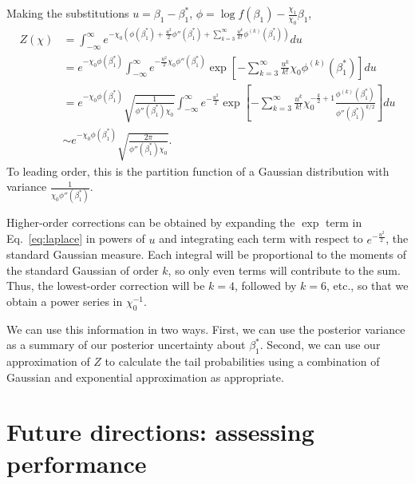 \documentclass[12pt, letterpaper]{article}
\begin{document}
Making the substitutions $u = \beta_1 - \beta_1^*$, $\phi = \log f(\beta_1) - \frac{\chi_1}{\chi_0} \beta_1$,
\begin{align}
    Z(\chi) & = \int_{-\infty}^{\infty}
        e^{- \chi_0 \left(\phi(\beta_1^*) + \frac{u^2}{2}\phi''(\beta_1^*) + \sum_{k=3}^{\infty}\frac{u^k}{k!}\phi^{(k)}(\beta_1^*) \right)} du \\
            & = e^{- \chi_0 \phi(\beta_1^*)}
            \int_{-\infty}^{\infty} e^{- \frac{u^2}{2} \chi_0 \phi''(\beta_1^*)} \exp \left[ - \sum_{k=3}^{\infty}\frac{u^k}{k!} \chi_0 \phi^{(k)}(\beta_1^*)\right] du \\
            & = e^{- \chi_0 \phi(\beta_1^*)} \sqrt{\frac{1}{\phi''(\beta_1^*)\chi_0}}
            \int_{-\infty}^{\infty} e^{- \frac{u^2}{2}} \exp \left[ - \sum_{k=3}^{\infty}\frac{u^k}{k!} \chi_0^{-\frac{k}{2}+1} \frac{\phi^{(k)}(\beta_1^*)}{{\phi''(\beta_1^*)}^{k/2}} \right] du \label{eq:laplace}\\
            & \sim e^{- \chi_0 \phi(\beta_1^*)} \sqrt{\frac{2\pi}{\phi''(\beta_1^*)\chi_0}}.
\end{align}
To leading order, this is the partition function of a Gaussian distribution with variance $\frac{1}{\chi_0 \phi''(\beta_1^*)}$.

Higher-order corrections can be obtained by expanding the $\exp$ term in Eq.~\ref{eq:laplace} in powers of $u$ and integrating each term with respect to $e^{-\frac{u^2}{2}}$, the standard Gaussian measure.
Each integral will be proportional to the moments of the standard Gaussian of order $k$, so only even terms will contribute to the sum.
Thus, the lowest-order correction will be $k = 4$, followed by $k = 6$, etc., so that we obtain a power series in $\chi_0^{-1}$.

We can use this information in two ways.
First, we can use the posterior variance as a summary of our posterior uncertainty about $\beta_1^*$.
Second, we can use our approximation of $Z$ to calculate the tail probabilities using a combination of Gaussian and exponential approximation as appropriate.

\section{Future directions: assessing performance}
\end{document}
